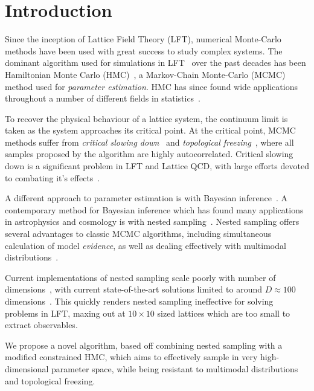 \documentclass[11pt]{article}
\begin{document}
    \section{Introduction}\label{Introduction}
    Since the inception of Lattice Field Theory (LFT), numerical Monte-Carlo methods have been used with great success to
    study complex systems.
    The dominant algorithm used for simulations in LFT~\cite{borsanyi2021leading} over the past decades has been
    Hamiltonian Monte Carlo
    (HMC)~\cite{HMC_Duane}, a Markov-Chain Monte-Carlo (MCMC) method used for \emph{parameter estimation}.
    HMC has since found wide applications throughout a number of different fields in
    statistics~\cite{girolami2011riemann, kramer2014hamiltonian}.

    To recover the physical behaviour of a lattice system, the continuum limit is taken as the system approaches its
    critical point.
    At the critical point, MCMC methods suffer from \emph{critical slowing down}~\cite{CriticalSlowingWOLFF} and
    \emph{topological freezing}~\cite{Hasenbusch_2018}, where all samples proposed by the algorithm are highly
    autocorrelated.
    Critical slowing down is a significant problem in LFT and Lattice QCD, with large efforts devoted to combating
    it's effects~\cite{Pawlowski_2020,Jansen_MLMC_2020,Albergo_Flow_LFT_2019, Hackett:2021idh,Abbott:2022hkm,Albergo:2022qfi,gao2017efficient}.

    A different approach to parameter estimation is with Bayesian inference~\cite{van2021bayesian}.
    A contemporary method for Bayesian inference which has found many applications in astrophysics and cosmology
    is with nested sampling~\cite{Skilling2006,Handley_polychord}.
    Nested sampling offers several advantages to classic MCMC algorithms, including simultaneous calculation of model
    \emph{evidence}, as well as dealing effectively with multimodal distributions~\cite{Skilling2006}.

    Current implementations of nested sampling scale poorly with number of dimensions~\cite{Feroz_2009, Handley_2015},
    with current state-of-the-art solutions limited to around $D \approx 100$ dimensions~\cite{NS_Review_2022}.
    This quickly renders nested sampling ineffective for solving problems in LFT, maxing out at $10 \times 10$ sized
    lattices which are too small to extract observables.

    We propose a novel algorithm, based off combining nested sampling with a modified constrained HMC, which aims
    to effectively sample in very high-dimensional parameter space, while being resistant to multimodal distributions
    and topological freezing.
\end{document}
